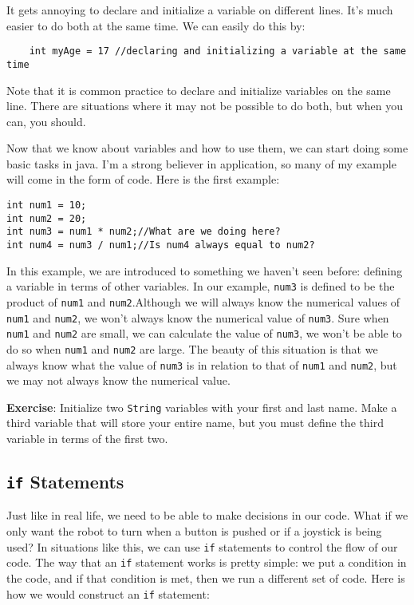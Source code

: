 \documentclass[11pt,fleqn]{article}
\begin{document}
It gets annoying to declare and initialize a variable on different lines. It's
much easier to do both at the same time. We can easily do this by:

\begin{verbatim}
    int myAge = 17 //declaring and initializing a variable at the same time
\end{verbatim}

Note that it is common practice to declare and initialize variables on the same
line. There are situations where it may not be possible to do both, but when you
can, you should.

Now that we know about variables and how to use them, we can start doing some
basic tasks in java. I'm a strong believer in application, so many of my example
will come in the form of code. Here is the first example:

\begin{verbatim}
int num1 = 10;
int num2 = 20;
int num3 = num1 * num2;//What are we doing here?
int num4 = num3 / num1;//Is num4 always equal to num2?
\end{verbatim}

In this example, we are introduced to something we haven't seen before: defining
a variable in terms of other variables. In our example, \texttt{num3} is defined
to be the product of \texttt{num1} and \texttt{num2}.Although we will always
know the numerical values of \texttt{num1} and \texttt{num2}, we won't always
know the numerical value of \texttt{num3}. Sure when \texttt{num1} and
\texttt{num2} are small, we can calculate the value of \texttt{num3}, we won't
be able to do so when \texttt{num1} and \texttt{num2} are large. The beauty of
this situation is that we always know what the value of \texttt{num3} is in
relation to that of \texttt{num1} and \texttt{num2}, but we may not always know
the numerical value. 

\textbf{Exercise}: Initialize two \texttt{String} variables with your first and
last name. Make a third variable that will store your entire name, but you must
define the third variable in terms of the first two. 

\begin{center}
\section*{\texttt{if} Statements}
\end{center}

Just like in real life, we need to be able to make decisions in our code. What
if we only want the robot to turn when a button is pushed or if a joystick is
being used? In situations like this, we can use \texttt{if} statements to
control the flow of our code. The way that an \texttt{if} statement works is
pretty simple: we put a condition in the code, and if that condition is met,
then we run a different set of code. Here is how we would construct an
\texttt{if} statement:
\end{document}
